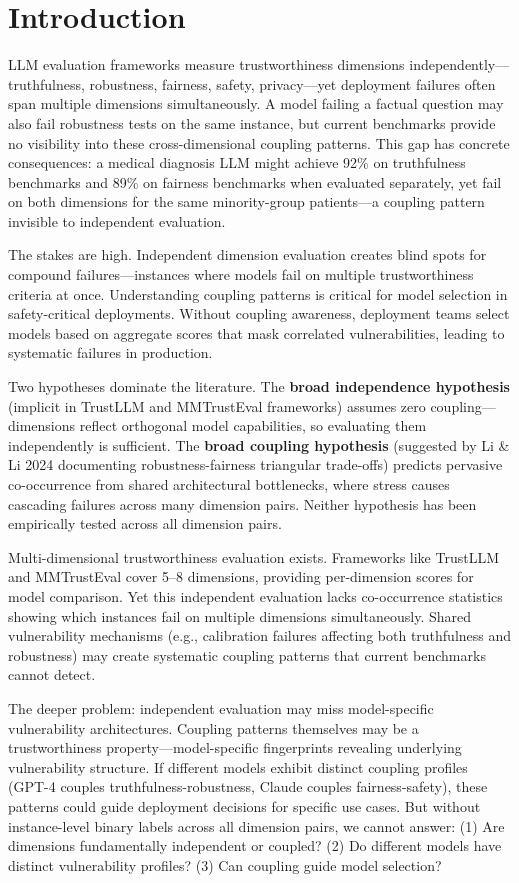 \section{Introduction}

LLM evaluation frameworks measure trustworthiness dimensions independently---truthfulness, robustness, fairness, safety, privacy---yet deployment failures often span multiple dimensions simultaneously. A model failing a factual question may also fail robustness tests on the same instance, but current benchmarks provide no visibility into these cross-dimensional coupling patterns. This gap has concrete consequences: a medical diagnosis LLM might achieve 92\% on truthfulness benchmarks and 89\% on fairness benchmarks when evaluated separately, yet fail on both dimensions for the same minority-group patients---a coupling pattern invisible to independent evaluation.

The stakes are high. Independent dimension evaluation creates blind spots for compound failures---instances where models fail on multiple trustworthiness criteria at once. Understanding coupling patterns is critical for model selection in safety-critical deployments. Without coupling awareness, deployment teams select models based on aggregate scores that mask correlated vulnerabilities, leading to systematic failures in production.

Two hypotheses dominate the literature. The \textbf{broad independence hypothesis} (implicit in TrustLLM and MMTrustEval frameworks) assumes zero coupling---dimensions reflect orthogonal model capabilities, so evaluating them independently is sufficient. The \textbf{broad coupling hypothesis} (suggested by Li \& Li 2024 documenting robustness-fairness triangular trade-offs) predicts pervasive co-occurrence from shared architectural bottlenecks, where stress causes cascading failures across many dimension pairs. Neither hypothesis has been empirically tested across all dimension pairs.

Multi-dimensional trustworthiness evaluation exists. Frameworks like TrustLLM and MMTrustEval cover 5--8 dimensions, providing per-dimension scores for model comparison. Yet this independent evaluation lacks co-occurrence statistics showing which instances fail on multiple dimensions simultaneously. Shared vulnerability mechanisms (e.g., calibration failures affecting both truthfulness and robustness) may create systematic coupling patterns that current benchmarks cannot detect.

The deeper problem: independent evaluation may miss model-specific vulnerability architectures. Coupling patterns themselves may be a trustworthiness property---model-specific fingerprints revealing underlying vulnerability structure. If different models exhibit distinct coupling profiles (GPT-4 couples truthfulness-robustness, Claude couples fairness-safety), these patterns could guide deployment decisions for specific use cases. But without instance-level binary labels across all dimension pairs, we cannot answer: (1) Are dimensions fundamentally independent or coupled? (2) Do different models have distinct vulnerability profiles? (3) Can coupling guide model selection?

